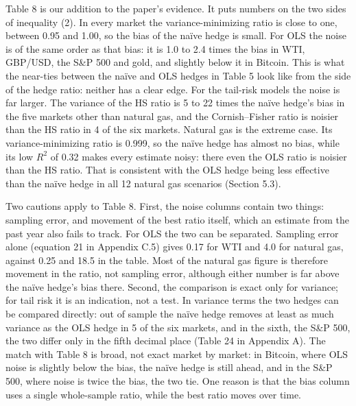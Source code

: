 \documentclass[11pt,letterpaper]{article}
\begin{document}
Table 8 is our addition to the paper's evidence. It puts numbers on the two sides of inequality (2). In every market the variance-minimizing ratio is close to one, between 0.95 and 1.00, so the bias of the naïve hedge is small. For OLS the noise is of the same order as that bias: it is 1.0 to 2.4 times the bias in WTI, GBP/USD, the S\&P 500 and gold, and slightly below it in Bitcoin. This is what the near-ties between the naïve and OLS hedges in Table 5 look like from the side of the hedge ratio: neither has a clear edge. For the tail-risk models the noise is far larger. The variance of the HS ratio is 5 to 22 times the naïve hedge's bias in the five markets other than natural gas, and the Cornish–Fisher ratio is noisier than the HS ratio in 4 of the six markets. Natural gas is the extreme case. Its variance-minimizing ratio is 0.999, so the naïve hedge has almost no bias, while its low $R^2$ of 0.32 makes every estimate noisy: there even the OLS ratio is noisier than the HS ratio. That is consistent with the OLS hedge being less effective than the naïve hedge in all 12 natural gas scenarios (Section 5.3).

Two cautions apply to Table 8. First, the noise columns contain two things: sampling error, and movement of the best ratio itself, which an estimate from the past year also fails to track. For OLS the two can be separated. Sampling error alone (equation 21 in Appendix C.5) gives 0.17 for WTI and 4.0 for natural gas, against 0.25 and 18.5 in the table. Most of the natural gas figure is therefore movement in the ratio, not sampling error, although either number is far above the naïve hedge's bias there. Second, the comparison is exact only for variance; for tail risk it is an indication, not a test. In variance terms the two hedges can be compared directly: out of sample the naïve hedge removes at least as much variance as the OLS hedge in 5 of the six markets, and in the sixth, the S\&P 500, the two differ only in the fifth decimal place (Table 24 in Appendix A). The match with Table 8 is broad, not exact market by market: in Bitcoin, where OLS noise is slightly below the bias, the naïve hedge is still ahead, and in the S\&P 500, where noise is twice the bias, the two tie. One reason is that the bias column uses a single whole-sample ratio, while the best ratio moves over time.
\end{document}
